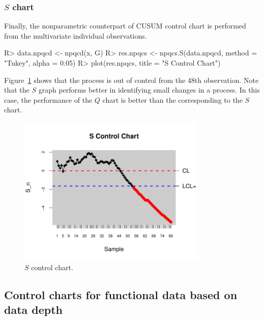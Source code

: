 \subsubsection{$S$ chart}
Finally, the nonparametric counterpart of CUSUM control chart is performed from the multivariate individual observations.
\begin{example}
R> data.npqcd <- npqcd(x, G)
R> res.npqcs <- npqcs.S(data.npqcd, method = "Tukey", alpha = 0.05)
R> plot(res.npqcs, title = "S Control Chart")
\end{example}
Figure~\ref{fig:Schart} shows that the process is out of control from the 48th observation.  
Note that the $S$ graph performs better in identifying small changes in a process. 
In this case, the performance of the $Q$ chart is better than the corresponding to the $S$ chart. 
\begin{figure}[!htb]
\begin{center}
\includegraphics[width=0.8\textwidth]{article-Schart-plot}
\caption{$S$ control chart.}
\label{fig:Schart}
\end{center}
\end{figure}

\subsection{Control charts for functional data based on data depth}

